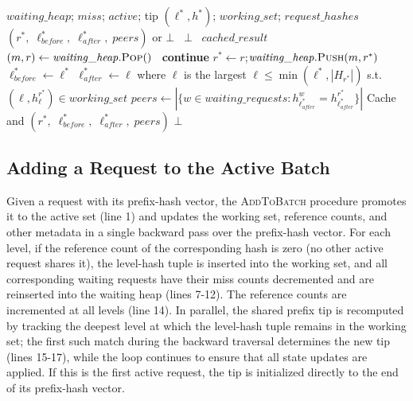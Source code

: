 \begin{algorithm}[t] 
\caption{\textsc{FindBest}()} 
\label{alg:find_best} 
\begin{algorithmic}[1] 
\Require $\mathit{waiting\_heap}$; $\mathit{miss}$; $\mathit{active}$; tip $(\ell^*, h^*)$; $\mathit{working\_set}$; $\mathit{request\_hashes}$ 
\Ensure $(r^*,\; \ell^*_{\mathit{before}},\; \ell^*_{\mathit{after}},\; \mathit{peers})$ or $\bot$ 
\ 
\Return $\bot$ 
\EndIf 
{}\ 
\Return $\mathit{cached\_result}$ 
\EndIf 
{} 
\State $(m, r) \gets \mathit{waiting\_heap}.\textsc{Pop}()$ 
\ 
\textbf{continue} 
\EndIf 
\State $r^* \gets r$;\quad $\mathit{waiting\_heap}.\textsc{Push}(m, r^*)$  
\State $\ell^*_{\mathit{before}} \gets \ell^*$ 
\State $\ell^*_{\mathit{after}} \gets \ell$ where $\ell$ is the largest $\ell \leq \min(\ell^*, |H_{r^*}|)$ s.t. $(\ell, h_\ell^{r^*}) \in \mathit{working\_set}$ \State $\mathit{peers} \gets |\{w \in \mathit{waiting\_requests} : h_{\ell^*_{\mathit{after}}}^w = h_{\ell^*_{\mathit{after}}}^{r^*}\}|$ 
\State Cache and \Return $(r^*,\; \ell^*_{\mathit{before}},\; \ell^*_{\mathit{after}},\; \mathit{peers})$ 
\EndWhile 
\State \Return $\bot$ 
\end{algorithmic} 
\end{algorithm}

\subsection{Adding a Request to the Active Batch}
Given a request with its prefix-hash vector, the \textsc{AddToBatch} procedure promotes it to the active set (line 1) and updates the working set, reference counts, and other metadata in a single backward pass over the prefix-hash vector. For each level, if the reference count of the corresponding hash is zero (no other active request shares it), the level-hash tuple is inserted into the working set, and all corresponding waiting requests have their miss counts decremented and are reinserted into the waiting heap (lines 7-12). The reference counts are incremented at all levels (line 14). In parallel, the shared prefix tip is recomputed by tracking the deepest level at which the level-hash tuple remains in the working set; the first such match during the backward traversal determines the new tip (lines 15-17), while the loop continues to ensure that all state updates are applied. If this is the first active request, the tip is initialized directly to the end of its prefix-hash vector.

